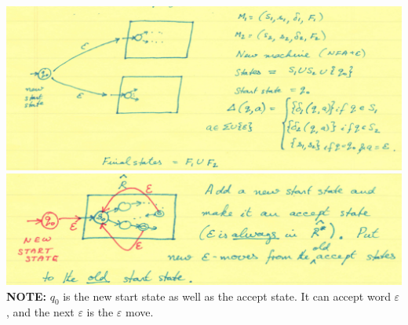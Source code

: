 \documentclass [9 pt]{article}
\theoremstyle{definition}
\begin{document}
\includegraphics[scale = 0.7]{2.png}\\
\includegraphics[scale = 0.55]{3.png}\\
\textbf{NOTE:} $q_0$ is the new start state as well as the accept state. It can accept word $\varepsilon$, and the next $\varepsilon$ is the $\varepsilon$ move.
\newpage
\end{document}
